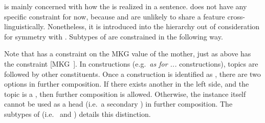 

 is mainly concerned with how the  is realized in
a sentence.  does not have any specific constraint for
now, because  and  are unlikely to
share a feature cross-linguistically.
Nonetheless, it is introduced
into the hierarchy out of consideration for symmetry with
.  Subtypes of  are constrained in the
following way.




\noindent Note that  has a constraint on the MKG
value of the mother, just as  above has the constraint
\mbox{[MKG ]}.  In  constructions
(e.g.\ \textit{as for ...}  constructions), topics are followed by
other constituents. Once a construction is identified as
, there are two options in further composition. If
there exists another  in the left side, and the topic is a
, then further composition is allowed. Otherwise,
the  instance itself cannot be used as a head
(i.e.\ a secondary ) in further composition.  The
subtypes of  (i.e.\  and
) details this
distinction.


